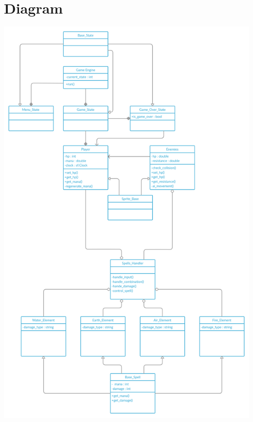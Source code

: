 \documentclass[12pt]{TDP005mall}
\begin{document}
\section{Diagram}
\begin{center}
\includegraphics[scale=0.18]{uml_diagram.jpg}
\end{center}
\end{document}
